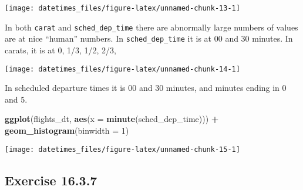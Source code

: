 \documentclass[]{book}
\newenvironment{Shaded}{\begin{snugshade}}{\end{snugshade}}
\newcommand{\DataTypeTok}[1]{\textcolor[rgb]{0.13,0.29,0.53}{#1}}
\newcommand{\DecValTok}[1]{\textcolor[rgb]{0.00,0.00,0.81}{#1}}
\newcommand{\KeywordTok}[1]{\textcolor[rgb]{0.13,0.29,0.53}{\textbf{#1}}}
\newcommand{\NormalTok}[1]{#1}
\newcommand{\OperatorTok}[1]{\textcolor[rgb]{0.81,0.36,0.00}{\textbf{#1}}}
\newcommand{\StringTok}[1]{\textcolor[rgb]{0.31,0.60,0.02}{#1}}
\theoremstyle{plain}
\theoremstyle{remark}
\begin{document}
\begin{center}\texttt{[image: datetimes\_files/figure-latex/unnamed-chunk-13-1]} \end{center}

In both \texttt{carat} and \texttt{sched\_dep\_time} there are
abnormally large numbers of values are at nice ``human'' numbers. In
\texttt{sched\_dep\_time} it is at 00 and 30 minutes. In carats, it is
at 0, 1/3, 1/2, 2/3,

\begin{Shaded}
\end{Shaded}

\begin{center}\texttt{[image: datetimes\_files/figure-latex/unnamed-chunk-14-1]} \end{center}

In scheduled departure times it is 00 and 30 minutes, and minutes ending
in 0 and 5.

\begin{Shaded}
\begin{Highlighting}[]
\KeywordTok{ggplot}\NormalTok{(flights_dt, }\KeywordTok{aes}\NormalTok{(}\DataTypeTok{x =} \KeywordTok{minute}\NormalTok{(sched_dep_time))) }\OperatorTok{+}
\StringTok{  }\KeywordTok{geom_histogram}\NormalTok{(}\DataTypeTok{binwidth =} \DecValTok{1}\NormalTok{)}
\end{Highlighting}
\end{Shaded}

\begin{center}\texttt{[image: datetimes\_files/figure-latex/unnamed-chunk-15-1]} \end{center}

\hypertarget{exercise-16.3.7}{%
\subsection*{\texorpdfstring{Exercise
{16.3.7}}{Exercise 16.3.7}}\label{exercise-16.3.7}}
\end{document}
